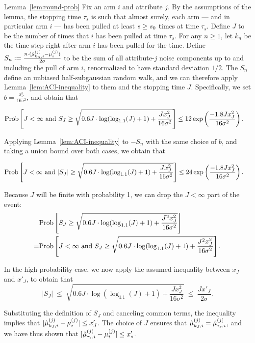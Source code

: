 \begin{extraproof}{Lemma~\ref{lem:round-prob}}
Fix an arm $i$ and attribute $j$.
By the assumptions of the lemma,
the stopping time $\tau_s$ is such that almost surely,
each arm --- and in particular arm $i$ --- has been pulled at least
$s \geq s_0$ times at time $\tau_s$.
Define $J$ to be the number of times that $i$ has been pulled at
time $\tau_s$.
For any $n \geq 1$, let $k_n$ be the time step right after arm $i$ has
been pulled for the  time. Define
$S_n := \frac{n \cdot (\hat{\mu}_{k_n,i}^{(j)} - \mu_{i}^{(j)})}{2 \sigma}$
to be the sum of all attribute-$j$ noise components up to and
including the  pull of arm $i$,
renormalized to have standard deviation $1/2$.
The $S_n$ define an unbiased half-subgaussian random walk,
and we can therefore apply Lemma~\ref{lem:ACI-inequality} to them and
the stopping time $J$.
Specifically, we set $b = \frac{x_J^2}{16 \sigma^2}$,
and obtain that

\begin{align*}
\Prob{J < \infty \mbox{ and } S_J \geq 
\sqrt{0.6 J \cdot \log (\log_{1.1}(J) + 1) + \frac{J x_J^2}{16 \sigma^2}}}
& \leq 12 \exp \left( \frac{-1.8 J x_J^2}{16 \sigma^2} \right).
\end{align*}

Applying Lemma~\ref{lem:ACI-inequality} to $-S_n$ with the same choice
of $b$, and taking a union bound over both cases, we obtain that

\begin{align*}
\Prob{J < \infty \mbox{ and } |S_J| \geq 
\sqrt{0.6 J \cdot \log (\log_{1.1}(J) + 1) + \frac{J x_J^2}{16 \sigma^2}}}
& \leq 24 \exp \left( \frac{-1.8 J x_J^2}{16 \sigma^2} \right).
\end{align*}

Because $J$ will be finite with probability 1, we can drop the
$J < \infty$ part of the event:
\begin{align*}
& \Prob{S_J \geq 
\sqrt{0.6 J \cdot \log (\log_{1.1}(J) + 1) + \frac{J^2 x_J^2}{16
    \sigma^2}}}\\
= & \Prob{J < \infty \mbox{ and } S_J \geq 
\sqrt{0.6 J \cdot \log (\log_{1.1}(J) + 1) + \frac{J^2 x_J^2}{16
    \sigma^2}}}.
\end{align*}

In the high-probability case, we now apply the assumed inequality
between $x_J$ and $x'_J$, to obtain that
\[
|S_J| \; \leq \;
\sqrt{0.6 J \cdot \log (\log_{1.1}(J) + 1) + \frac{J x_J^2}{16 \sigma^2}}
\; \leq \; \frac{J x'_J}{2 \sigma}.
\]

Substituting the definition of $S_J$ and canceling common terms,
the inequality implies that
$|\hat{\mu}_{k_J,i}^{(j)} - \mu_{i}^{(j)}| \leq x'_J$.
The choice of $J$ ensures that
$\hat{\mu}_{k_J,i}^{(j)} = \hat{\mu}_{\tau_s,i}^{(j)}$,
and we have thus shown that
$|\hat{\mu}_{\tau_s,i}^{(j)} - \mu_{i}^{(j)}| \leq x'_s$.
\end{extraproof}

